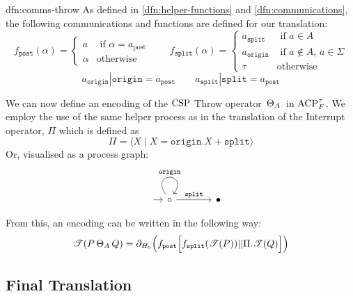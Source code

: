 \documentclass[../hons_project.tex]{subfiles}
\begin{document}
\begin{dfn}{dfn:comms-throw}{}
	As defined in \ref{dfn:helper-functions} and \ref{dfn:communications}, the following communications and functions are defined for our translation:
	\[f_{\mathtt{post}}(\alpha) = \begin{cases}
			a      & \text{ if } \alpha = a_{\mathrm{post}} \\
			\alpha & \text{otherwise}
		\end{cases} \qquad f_{\mathtt{split}}(\alpha) = \begin{cases}
				      a_{\mathtt{split}}  & \text{ if } a\in A                    \\
				      a_{\mathtt{origin}} & \text{ if } a\not\in A,\, a\in \Sigma \\
				      \tau                & \mathrm{otherwise}
			      \end{cases}\]
	\[a_{\mathtt{origin}} | \mathtt{origin} = a_{\mathtt{post}} \qquad a_{\mathtt{split}} | \mathtt{split} = a_{\mathtt{post}}\]
\end{dfn}

We can now define an encoding of the $\mathrm{CSP}$ Throw operator $\,\Theta_{A}\,$ in $\mathrm{ACP}_{F}^{\tau}$. We employ the use of the same helper process as in the translation of the Interrupt operator, $\Pi$ which is defined as
\[\Pi = \langle X \mid X = \mathtt{origin}.X + \mathtt{split} \rangle\]
Or, visualised as a process graph:
\[\begin{tikzcd}[column sep=scriptsize, row sep=scriptsize]
		{} & \circ && \bullet
		\arrow[shorten <=8pt, from=1-1, to=1-2]
		\arrow["{\mathtt{origin}}", from=1-2, to=1-2, loop, in=55, out=125, distance=10mm]
		\arrow["{\mathtt{split}}", from=1-2, to=1-4]
	\end{tikzcd}\]

From this, an encoding can be written in the following way:
\[\mathscr{T}(P \,\Theta_{A}\, Q) = \partial_{H_{0}}\Bigl(f_{\mathtt{post}}\Bigl[ f_{\mathtt{split}}(\mathscr{T}(P)) | | \Pi.\mathscr{T}(Q) \Bigr]\Bigr)\]





\newpage
\subsection{Final Translation}
\end{document}
